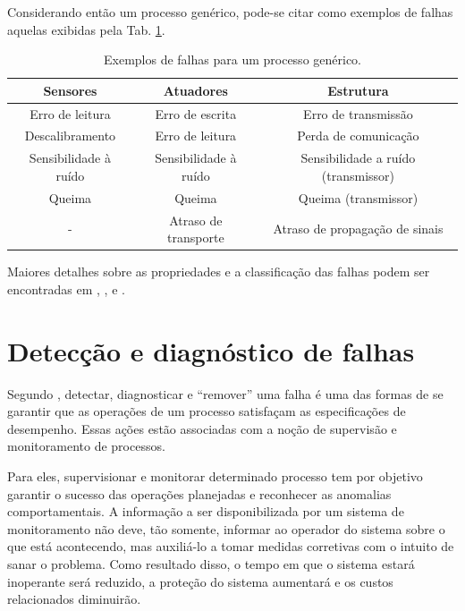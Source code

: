 Considerando então um processo genérico, pode-se citar como exemplos de falhas
aquelas exibidas pela Tab. \ref{tab:falhas}.

\begin{table}[htb]
\centering
\caption{Exemplos de falhas para um processo genérico.}
\label{tab:falhas}
\vspace{0.25cm}
\begin{tabular}{|c|c|c|}
\hline
{\bf Sensores} & {\bf Atuadores} & {\bf Estrutura}\\
\hline
\hline
Erro de leitura & Erro de escrita & Erro de transmissão\\
\hline
Descalibramento & Erro de leitura & Perda de comunicação\\
\hline
Sensibilidade à ruído & Sensibilidade à ruído & Sensibilidade a ruído
(transmissor)\\
\hline
Queima & Queima & Queima (transmissor)\\
\hline
- & Atraso de transporte & Atraso de propagação de sinais\\
\hline
\end{tabular}
\end{table}

Maiores detalhes sobre as propriedades e a classificação das falhas podem ser
encontradas em , ,
 e .


\section{Detecção e diagnóstico de falhas}
Segundo , detectar, diagnosticar e ``remover'' uma falha
é uma das formas de se garantir que as operações de um processo satisfaçam as
especificações de desempenho. Essas ações estão associadas com a noção de
supervisão e monitoramento de processos.

Para eles, supervisionar e monitorar determinado processo tem por objetivo
garantir o sucesso das operações planejadas e reconhecer as anomalias
comportamentais. A informação a ser disponibilizada por um sistema de
monitoramento não deve, tão somente, informar ao operador do sistema sobre o que
está acontecendo, mas auxiliá-lo a tomar medidas corretivas com o intuito de
sanar o problema. Como resultado disso, o tempo em que o sistema estará
inoperante será reduzido, a proteção do sistema aumentará e os custos
relacionados diminuirão.


